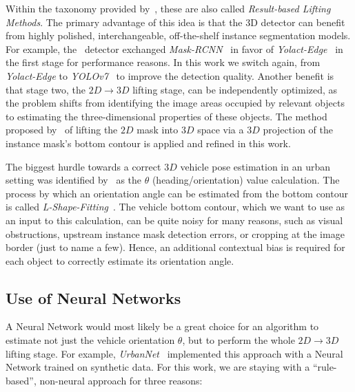 Within the taxonomy provided by~\cite{survey2022}, these are also called \textit{Result-based Lifting Methods}.
The primary advantage of this idea is that the 3D detector can benefit from highly polished, interchangeable, off-the-shelf instance segmentation models.
For example, the~\cite{leonthesis} detector exchanged \textit{Mask-RCNN}~\cite{he2017mask} in favor of \textit{Yolact-Edge}~\cite{liu2021yolactedge} in the first stage for performance reasons.
In this work we switch again, from \textit{Yolact-Edge} to \textit{YOLOv7}~\cite{wang2022yolov7} to improve the detection quality.
Another benefit is that stage two, the $2D \rightarrow 3D$ lifting stage, can be independently optimized, as the problem shifts from identifying the image areas occupied by relevant objects to estimating the three-dimensional properties of these objects.
The method proposed by~\cite{leonthesis} of lifting the $2D$ mask into $3D$ space via a $3D$ projection of the instance mask's bottom contour is applied and refined in this work.

The biggest hurdle towards a correct $3D$ vehicle pose estimation in an urban setting was identified by~\cite{leonthesis} as the $\theta$ (heading/orientation) value calculation.
The process by which an orientation angle can be estimated from the bottom contour is called \textit{L-Shape-Fitting}~\cite{zhang2017efficient}.
The vehicle bottom contour, which we want to use as an input to this calculation, can be quite noisy for many reasons, such as visual obstructions, upstream instance mask detection errors, or cropping at the image border (just to name a few).
Hence, an additional contextual bias is required for each object to correctly estimate its orientation angle.

\subsection{Use of Neural Networks}
\label{subsec:neural}

A Neural Network would most likely be a great choice for an algorithm to estimate not just the vehicle orientation $\theta$, but to perform the whole $2D \rightarrow 3D$ lifting stage.
For example, \textit{UrbanNet}~\cite{carrillo2021urbannet} implemented this approach with a Neural Network trained on synthetic data.
For this work, we are staying with a \enquote{rule-based}, non-neural approach for three reasons:

